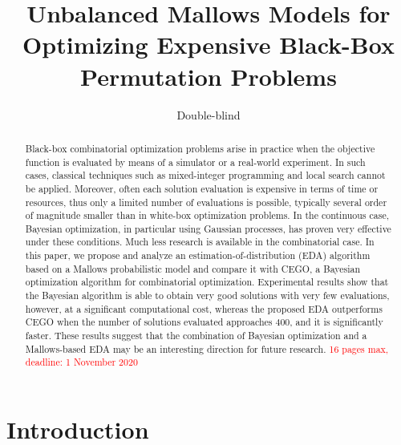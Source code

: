 \documentclass[runningheads]{llncs}
\title{Unbalanced Mallows Models for Optimizing Expensive Black-Box Permutation Problems}
\author{Double-blind}
\date{}%
\begin{document}
\maketitle

\begin{abstract}
  Black-box combinatorial optimization problems arise in practice when the
  objective function is evaluated by means of a simulator or a real-world
  experiment. In such cases, classical techniques such as mixed-integer
  programming and local search cannot be applied. Moreover, often each solution
  evaluation is expensive in terms of time or resources, thus only a limited
  number of evaluations is possible, typically several order of magnitude
  smaller than in white-box optimization problems. In the continuous case,
  Bayesian optimization, in particular using Gaussian processes, has proven
  very effective under these conditions. Much less research is available in the
  combinatorial case. In this paper, we propose and analyze an
  estimation-of-distribution (EDA) algorithm based on a Mallows probabilistic
  model and compare it with CEGO, a Bayesian optimization algorithm for
  combinatorial optimization. Experimental results show that the Bayesian
  algorithm is able to obtain very good solutions with very few evaluations,
  however, at a significant computational cost, whereas the proposed EDA
  outperforms CEGO when the number of solutions evaluated approaches 400, and
  it is significantly faster. These results suggest that the combination of
  Bayesian optimization and a Mallows-based EDA may be an interesting direction
  for future research.\sloppy  
\textcolor{red}{16 pages max, deadline: 1 November 2020}
\end{abstract}

\section{Introduction}
\end{document}
